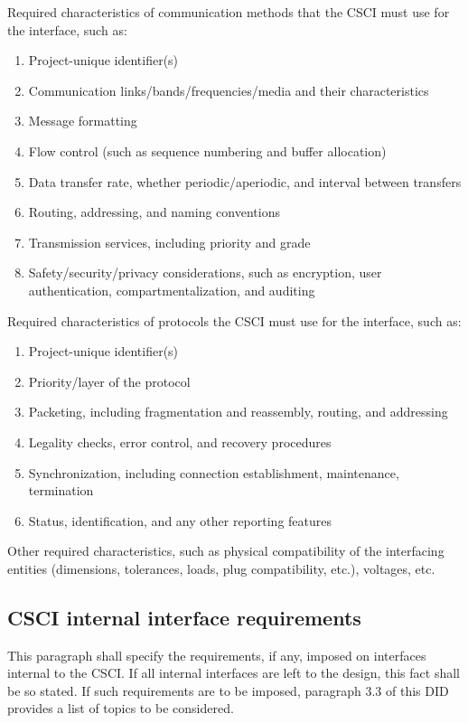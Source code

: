 \documentclass{fidata-report-template}
\begin{document}
Required characteristics of communication methods that the CSCI must use
for the interface, such as:

\begin{enumerate}
\itemsep1pt\parskip0pt
\item
  Project-unique identifier(s)
\item
  Communication links/bands/frequencies/media and their characteristics
\item
  Message formatting
\item
  Flow control (such as sequence numbering and buffer allocation)
\item
  Data transfer rate, whether periodic/aperiodic, and interval between
  transfers
\item
  Routing, addressing, and naming conventions
\item
  Transmission services, including priority and grade
\item
  Safety/security/privacy considerations, such as encryption, user
  authentication, compartmentalization, and auditing
\end{enumerate}

Required characteristics of protocols the CSCI must use for the
interface, such as:

\begin{enumerate}
\itemsep1pt\parskip0pt
\item
  Project-unique identifier(s)
\item
  Priority/layer of the protocol
\item
  Packeting, including fragmentation and reassembly, routing, and
  addressing
\item
  Legality checks, error control, and recovery procedures
\item
  Synchronization, including connection establishment, maintenance,
  termination
\item
  Status, identification, and any other reporting features
\end{enumerate}

Other required characteristics, such as physical compatibility of the
interfacing entities (dimensions, tolerances, loads, plug compatibility,
etc.), voltages, etc.

\subsection{CSCI internal interface requirements}

This paragraph shall specify the requirements, if any, imposed on
interfaces internal to the CSCI. If all internal interfaces are left to
the design, this fact shall be so stated. If such requirements are to be
imposed, paragraph 3.3 of this DID provides a list of topics to be
considered.
\end{document}
